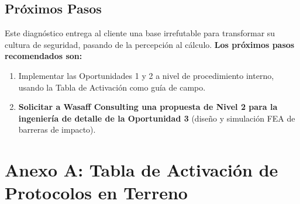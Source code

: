 \documentclass[11pt, a4paper, spanish]{article}
\begin{document}
\subsection*{Próximos Pasos}
Este diagnóstico entrega al cliente una base irrefutable para transformar su cultura de seguridad, pasando de la percepción al cálculo.
\textbf{Los próximos pasos recomendados son:}
\begin{enumerate}
\item Implementar las Oportunidades 1 y 2 a nivel de procedimiento interno, usando la Tabla de Activación como guía de campo.
\item \textbf{Solicitar a Wasaff Consulting una propuesta de Nivel 2 para la ingeniería de detalle de la Oportunidad 3} (diseño y simulación FEA de barreras de impacto).
\end{enumerate}

\begin{center}
    \vspace{0.5cm}
\end{center}

\clearpage
\section*{Anexo A: Tabla de Activación de Protocolos en Terreno}
\end{document}
